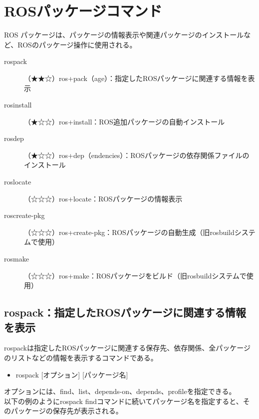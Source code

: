 \section{ROSパッケージコマンド}

ROS パッケージは、パッケージの情報表示や関連パッケージのインストールなど、ROSのパッケージ操作に使用される。

\vspace{\baselineskip}
\noindent
\begin{description}
\item[rospack]（★★☆）ros+pack（age）：指定したROSパッケージに関連する情報を表示
\item[rosinstall]（★☆☆）ros+install：ROS追加パッケージの自動インストール
\item[rosdep]（★☆☆）ros+dep（endencies）：ROSパッケージの依存関係ファイルのインストール
\item[roslocate]（☆☆☆）ros+locate：ROSパッケージの情報表示
\item[roscreate-pkg]（☆☆☆）ros+create-pkg：ROSパッケージの自動生成（旧rosbuildシステムで使用）
\item[rosmake]（☆☆☆）ros+make：ROSパッケージをビルド（旧rosbuildシステムで使用）
\end{description}
\vspace{\baselineskip}

\subsection{rospack：指定したROSパッケージに関連する情報を表示}

rospackは指定したROSパッケージに関連する保存先、依存関係、全パッケージのリストなどの情報を表示するコマンドである。

\vspace{\baselineskip}
\begin{itemize}
\item  rospack [オプション] [パッケージ名]
\end{itemize}
\vspace{\baselineskip}

オプションには、find、list、depends-on、depends、profileを指定できる。\\

以下の例のようにrospack findコマンドに続いてパッケージ名を指定すると、そのパッケージの保存先が表示される。

